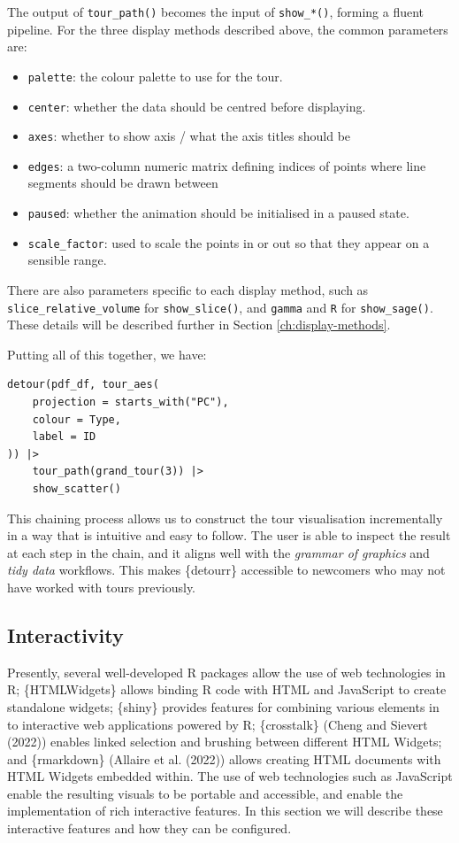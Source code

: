 The output of \texttt{tour\_path()} becomes the input of \texttt{show\_*()}, forming a fluent pipeline. For the three display methods described above, the common parameters are:

\begin{itemize}
\tightlist
\item
  \texttt{palette}: the colour palette to use for the tour.
\item
  \texttt{center}: whether the data should be centred before displaying.
\item
  \texttt{axes}: whether to show axis / what the axis titles should be
\item
  \texttt{edges}: a two-column numeric matrix defining indices of points where line segments should be drawn between
\item
  \texttt{paused}: whether the animation should be initialised in a paused state.
\item
  \texttt{scale\_factor}: used to scale the points in or out so that they appear on a sensible range.
\end{itemize}

There are also parameters specific to each display method, such as \texttt{slice\_relative\_volume} for \texttt{show\_slice()}, and \texttt{gamma} and \texttt{R} for \texttt{show\_sage()}. These details will be described further in Section \ref{ch:display-methods}.

Putting all of this together, we have:

\begin{verbatim}
detour(pdf_df, tour_aes(
    projection = starts_with("PC"),
    colour = Type,
    label = ID
)) |>
    tour_path(grand_tour(3)) |>
    show_scatter()
\end{verbatim}

This chaining process allows us to construct the tour visualisation incrementally in a way that is intuitive and easy to follow. The user is able to inspect the result at each step in the chain, and it aligns well with the \emph{grammar of graphics} and \emph{tidy data} workflows. This makes \{detourr\} accessible to newcomers who may not have worked with tours previously.

\hypertarget{interactivity}{%
\subsection{Interactivity}\label{interactivity}}

Presently, several well-developed R packages allow the use of web technologies in R; \{HTMLWidgets\} allows binding R code with HTML and JavaScript to create standalone widgets; \{shiny\} provides features for combining various elements in to interactive web applications powered by R; \{crosstalk\} (Cheng and Sievert (2022)) enables linked selection and brushing between different HTML Widgets; and \{rmarkdown\} (Allaire et al. (2022)) allows creating HTML documents with HTML Widgets embedded within. The use of web technologies such as JavaScript enable the resulting visuals to be portable and accessible, and enable the implementation of rich interactive features. In this section we will describe these interactive features and how they can be configured.

